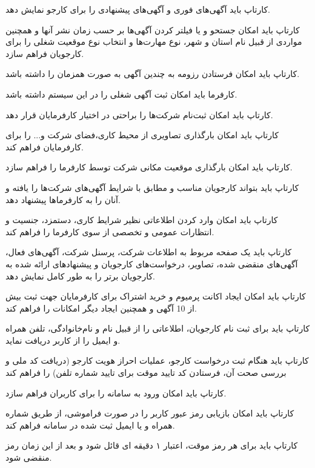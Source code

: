 \begin{enumerate}
	\addeditem
	کارتاپ باید آگهی‌های فوری و آگهی‌های پیشنهادی را برای کارجو نمایش دهد.
	
	
	\addeditem
	کارتاپ باید امکان جستحو و یا فیلتر کردن آگهی‌ها بر حسب زمان نشر آنها و همچنین  مواردی از قبیل نام استان و شهر، نوع مهارت‌ها و انتخاب نوع موقعیت شغلی را برای کارجویان فراهم سازد.
	
	\addeditem
	کارتاپ باید امکان فرستادن رزومه به چندین آگهی به صورت همزمان را داشته باشد. 
	
	
	\addeditem
	کارفرما باید امکان ثبت آگهی شغلی را در این سیستم داشته باشد.
	
	\addeditem
	کارتاپ باید امکان ثبت‌نام شرکت‌ها را براحتی در اختیار کارفرما‌یان قرار دهد.
	
	\addeditem
	کارتاپ باید امکان بارگذاری تصاویری از محیط کاری،فضای شرکت و... را برای کارفرمایان فراهم کند. 
	
	\addeditem
	کارتاپ باید امکان بارگذاری موقعیت مکانی شرکت توسط کارفرما را فراهم سازد.
	
	\addeditem
	کارتاپ باید بتواند کارجویان مناسب و مطابق با شرایط آگهی‌های شرکت‌ها را یافته و آنان را به کارفرما‌ها پیشنهاد دهد.
	
	\addeditem
	کارتاپ باید امکان وارد کردن اطلاعاتی نظیر شرایط کاری، دستمزد، جنسیت و انتظارات عمومی و تخصصی از سوی کارفرما را فراهم کند.
	
	\addeditem
	کارتاپ باید یک صفحه مربوط به اطلاعات شرکت، پرسنل شرکت، آگهی‌های فعال، آگهی‌های منقضی شده، تصاویر، درخواست‌های کارجویان و پیشنهاد‌های ارائه شده به کارجویان برتر را به طور کامل نمایش دهد.
	
	\addeditem
	کارتاپ باید امکان ایجاد اکانت پرمیوم و خرید اشتراک برای کارفرمایان جهت ثبت بیش از 10 آگهی و همچنین ایجاد دیگر امکانات را فراهم کند.
	
	\addeditem
	کارتاپ باید برای ثبت نام کارجویان، اطلاعاتی را از قبیل نام و نام‌خانوادگی، تلفن همراه و ایمیل را از کاربر دریافت نماید.
	
	\addeditem
	کارتاپ باید هنگام ثبت درخواست کارجو، عملیات احراز هویت کارجو (دریافت کد ملی و بررسی صحت آن، فرستادن کد تایید موقت برای تایید شماره تلفن) را فراهم کند
	
	\addeditem
	کارتاپ باید امکان ورود به سامانه را برای کاربران فراهم سازد.
	
	\begin{enumerate}
		\subr
		کارتاپ باید امکان بازیابی رمز عبور کاربر را در صورت فراموشی، از طریق شماره همراه و یا ایمیل ثبت شده در سامانه فراهم کند.
		
		\subr
		کارتاپ باید برای هر رمز موقت، اعتبار ۱ دقیقه ای قائل شود و بعد از این زمان رمز منقضی شود.
	\end{enumerate}
	

\end{enumerate}
